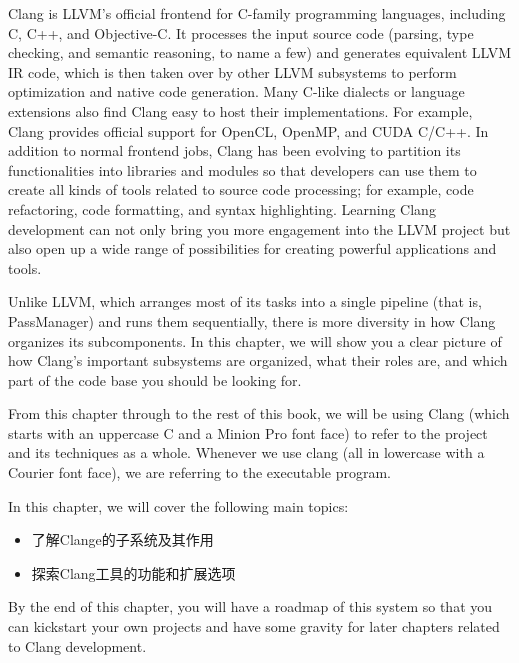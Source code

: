 Clang is LLVM's official frontend for C-family programming languages, including C, C++, and Objective-C. It processes the input source code (parsing, type checking, and semantic reasoning, to name a few) and generates equivalent LLVM IR code, which is then taken over by other LLVM subsystems to perform optimization and native code generation. Many C-like dialects or language extensions also find Clang easy to host their implementations. For example, Clang provides official support for OpenCL, OpenMP, and CUDA C/C++. In addition to normal frontend jobs, Clang has been evolving to partition its functionalities into libraries and modules so that developers can use them to create all kinds of tools related to source code processing; for example, code refactoring, code formatting, and syntax highlighting. Learning Clang development can not only bring you more engagement into the LLVM project but also open up a wide range of possibilities for creating powerful applications and tools.

Unlike LLVM, which arranges most of its tasks into a single pipeline (that is, PassManager) and runs them sequentially, there is more diversity in how Clang organizes its subcomponents. In this chapter, we will show you a clear picture of how Clang's important subsystems are organized, what their roles are, and which part of the code base you should be looking for.

\begin{tcolorbox}[colback=blue!5!white,colframe=blue!75!black, fonttitle=\bfseries,title=Terminology]
\hspace*{0.7cm}From this chapter through to the rest of this book, we will be using Clang (which starts with an uppercase C and a Minion Pro font face) to refer to the project and its techniques as a whole. Whenever we use clang (all in lowercase with a Courier font face), we are referring to the executable program.
\end{tcolorbox}

In this chapter, we will cover the following main topics:

\begin{itemize}
\item 了解Clange的子系统及其作用
\item 探索Clang工具的功能和扩展选项
\end{itemize}

By the end of this chapter, you will have a roadmap of this system so that you can kickstart your own projects and have some gravity for later chapters related to Clang development.


